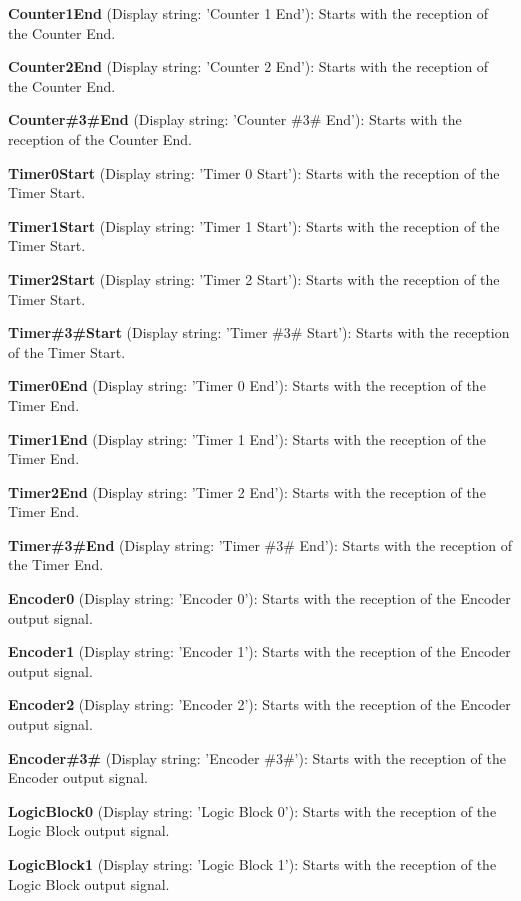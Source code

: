 \begin{DoxyItemize}
\item {\bfseries Counter1\+End} (Display string\+: 'Counter 1 End')\+: Starts with the reception of the Counter End.
\item {\bfseries Counter2\+End} (Display string\+: 'Counter 2 End')\+: Starts with the reception of the Counter End.
\item {\bfseries Counter\#3\#End} (Display string\+: 'Counter \#3\# End')\+: Starts with the reception of the Counter End.
\item {\bfseries Timer0\+Start} (Display string\+: 'Timer 0 Start')\+: Starts with the reception of the Timer Start.
\item {\bfseries Timer1\+Start} (Display string\+: 'Timer 1 Start')\+: Starts with the reception of the Timer Start.
\item {\bfseries Timer2\+Start} (Display string\+: 'Timer 2 Start')\+: Starts with the reception of the Timer Start.
\item {\bfseries Timer\#3\#Start} (Display string\+: 'Timer \#3\# Start')\+: Starts with the reception of the Timer Start.
\item {\bfseries Timer0\+End} (Display string\+: 'Timer 0 End')\+: Starts with the reception of the Timer End.
\item {\bfseries Timer1\+End} (Display string\+: 'Timer 1 End')\+: Starts with the reception of the Timer End.
\item {\bfseries Timer2\+End} (Display string\+: 'Timer 2 End')\+: Starts with the reception of the Timer End.
\item {\bfseries Timer\#3\#End} (Display string\+: 'Timer \#3\# End')\+: Starts with the reception of the Timer End.
\item {\bfseries Encoder0} (Display string\+: 'Encoder 0')\+: Starts with the reception of the Encoder output signal.
\item {\bfseries Encoder1} (Display string\+: 'Encoder 1')\+: Starts with the reception of the Encoder output signal.
\item {\bfseries Encoder2} (Display string\+: 'Encoder 2')\+: Starts with the reception of the Encoder output signal.
\item {\bfseries Encoder\#3\#} (Display string\+: 'Encoder \#3\#')\+: Starts with the reception of the Encoder output signal.
\item {\bfseries Logic\+Block0} (Display string\+: 'Logic Block 0')\+: Starts with the reception of the Logic Block output signal.
\item {\bfseries Logic\+Block1} (Display string\+: 'Logic Block 1')\+: Starts with the reception of the Logic Block output signal.

\end{DoxyItemize}
